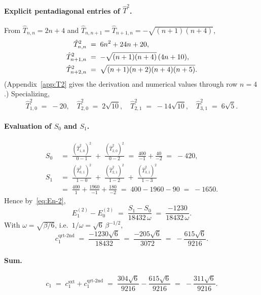 \documentclass[11pt,a4paper]{article}
\theoremstyle{definition}
\begin{document}
\paragraph{Explicit pentadiagonal entries of $\hat T^2$.}
From $\hat T_{n,n}=2n+4$ and $\hat T_{n,n+1}=\hat T_{n+1,n}=-\sqrt{(n+1)(n+4)}$,
\begin{align}
\hat T^2_{n,n} &\;=\; 6n^2 + 24n + 20,
\notag\\
\hat T^2_{n+1,n} &\;=\; -\sqrt{(n+1)(n+4)}\,(4n+10),
\label{eq:T2-entries}\\
\hat T^2_{n+2,n} &\;=\; \sqrt{(n+1)(n+2)(n+4)(n+5)}. \notag
\end{align}
(Appendix~\ref{app:T2} gives the derivation and numerical values
through row $n=4$.) Specializing,
\[
\hat T^2_{1,0} \;=\; -20,
\quad \hat T^2_{2,0} \;=\; 2\sqrt{10},
\quad \hat T^2_{2,1} \;=\; -14\sqrt{10},
\quad \hat T^2_{3,1} \;=\; 6\sqrt{5}.
\]

\paragraph{Evaluation of $S_0$ and $S_1$.}
\begin{align*}
S_0 &\;=\; \frac{(\hat T^2_{1,0})^2}{0-1}
\;+\;\frac{(\hat T^2_{2,0})^2}{0-2}
\;=\; \frac{400}{-1} + \frac{40}{-2} \;=\; -420,\\
S_1 &\;=\; \frac{(\hat T^2_{0,1})^2}{1-0}
\;+\;\frac{(\hat T^2_{2,1})^2}{1-2}
\;+\;\frac{(\hat T^2_{3,1})^2}{1-3}\\
&\;=\; \frac{400}{1} + \frac{1960}{-1} + \frac{180}{-2}
\;=\; 400 - 1960 - 90 \;=\; -1650.
\end{align*}
Hence by~\eqref{eq:En-2},
\[
E_1^{(2)} - E_0^{(2)}
\;=\; \frac{S_1 - S_0}{18432\,\omega}
\;=\; \frac{-1230}{18432\,\omega}.
\]
With $\omega = \sqrt{\beta/6}$, i.e.\ $1/\omega = \sqrt{6}\,\beta^{-1/2}$,
\begin{equation}\label{eq:c1-quart}
c_1^{\mathrm{qrt\text{-}2nd}}
\;=\; \frac{-1230\sqrt{6}}{18432}
\;=\; \frac{-205\sqrt{6}}{3072}
\;=\; -\frac{615\sqrt{6}}{9216}.
\end{equation}

\paragraph{Sum.}
\begin{equation}\label{eq:c1-final}
c_1
\;=\;
c_1^{\mathrm{sxt}} + c_1^{\mathrm{qrt\text{-}2nd}}
\;=\;
\frac{304\sqrt{6}}{9216} - \frac{615\sqrt{6}}{9216}
\;=\; -\frac{311\sqrt{6}}{9216}.
\end{equation}
\end{document}
